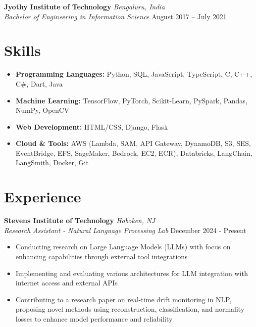 \documentclass[11pt,a4paper]{article}
\begin{document}
\vspace{0.7em}
\noindent\textbf{Jyothy Institute of Technology} \hfill \textit{Bengaluru, India}\\
\textit{Bachelor of Engineering in Information Science} \hfill August 2017 – July 2021\\
\vspace{-0.5em}
\section*{Skills}
\begin{itemize}[noitemsep,topsep=2pt]
    \item \textbf{Programming Languages:} Python, SQL, JavaScript, TypeScript, C, C++, C\#, Dart, Java
    \item \textbf{Machine Learning:} TensorFlow, PyTorch, Scikit-Learn, PySpark, Pandas, NumPy, OpenCV
    \item \textbf{Web Development:} HTML/CSS, Django, Flask
    \item \textbf{Cloud \& Tools:} AWS (Lambda, SAM, API Gateway, DynamoDB, S3, SES, EventBridge, EFS, SageMaker, Bedrock, EC2, ECR), Databricks, LangChain, LangSmith, Docker, Git
\end{itemize}

\section*{Experience}
\noindent\textbf{Stevens Institute of Technology} \hfill \textit{Hoboken, NJ}\\
\textit{Research Assistant - Natural Language Processing Lab} \hfill December 2024 - Present
\begin{itemize}[noitemsep,topsep=2pt]
    \item Conducting research on Large Language Models (LLMs) with focus on enhancing capabilities through external tool integrations
    \item Implementing and evaluating various architectures for LLM integration with internet access and external APIs
    \item Contributing to a research paper on real-time drift monitoring in NLP, proposing novel methods using reconstruction, classification, and normality losses to enhance model performance and reliability
\end{itemize}
\vspace{-0.3em}
\end{document}
